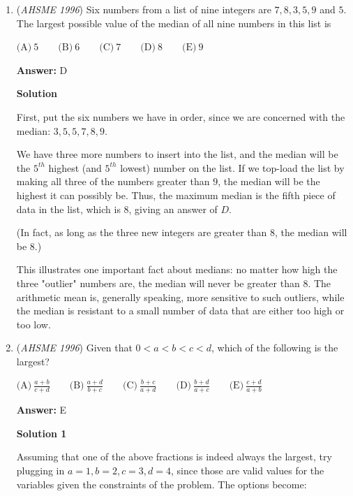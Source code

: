 \begin{enumerate}
 \begin{align*} \frac{(3!)!}{3!} &= \frac{6!}{3!} \\ &= \frac{720}{6} \\ &= \boxed{\textbf{(E) }120} \end{align*}




	\item (\textit{AHSME 1996}) Six numbers from a list of nine integers are $7,8,3,5, 9$ and $5$. The largest possible value of the median of all nine numbers in this list is


 $\text{(A)}\ 5\qquad\text{(B)}\ 6\qquad\text{(C)}\ 7\qquad\text{(D)}\ 8\qquad\text{(E)}\ 9$

 \textbf{Answer: }D



\textbf{Solution}

First, put the six numbers we have in order, since we are concerned with the median:  $3, 5, 5, 7, 8, 9$.

 We have three more numbers to insert into the list, and the median will be the $5^{th}$ highest (and $5^{th}$ lowest) number on the list.  If we top-load the list by making all three of the numbers greater than $9$, the median will be the highest it can possibly be.  Thus, the maximum median is the fifth piece of data in the list, which is $8$, giving an answer of $\boxed{D}$.

 (In fact, as long as the three new integers are greater than $8$, the median will be $8$.)

 This illustrates one important fact about medians:  no matter how high the three "outlier" numbers are, the median will never be greater than $8$.  The arithmetic mean is, generally speaking, more sensitive to such outliers, while the median is resistant to a small number of data that are either too high or too low.  

 


	\item (\textit{AHSME 1996}) Given that $0 < a < b < c < d$, which of the following is the largest?


 $\text{(A)}\  \frac{a+b}{c+d} \qquad\text{(B)}\ \frac{a+d}{b+c} \qquad\text{(C)}\  \frac{b+c}{a+d} \qquad\text{(D)}\  \frac{b+d}{a+c} \qquad\text{(E)}\ \frac{c+d}{a+b}$

 \textbf{Answer: }E



\textbf{Solution 1}

Assuming that one of the above fractions is indeed always the largest, try plugging in $a=1, b=2, c=3, d=4$, since those are valid values for the variables given the constraints of the problem.  The options become:


\end{enumerate}
